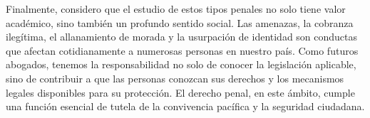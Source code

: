 \documentclass[12pt,letterpaper]{article}
\begin{document}
Finalmente, considero que el estudio de estos tipos penales no solo tiene valor académico, sino también un profundo sentido social. Las amenazas, la cobranza ilegítima, el allanamiento de morada y la usurpación de identidad son conductas que afectan cotidianamente a numerosas personas en nuestro país. Como futuros abogados, tenemos la responsabilidad no solo de conocer la legislación aplicable, sino de contribuir a que las personas conozcan sus derechos y los mecanismos legales disponibles para su protección. El derecho penal, en este ámbito, cumple una función esencial de tutela de la convivencia pacífica y la seguridad ciudadana.
\end{document}
